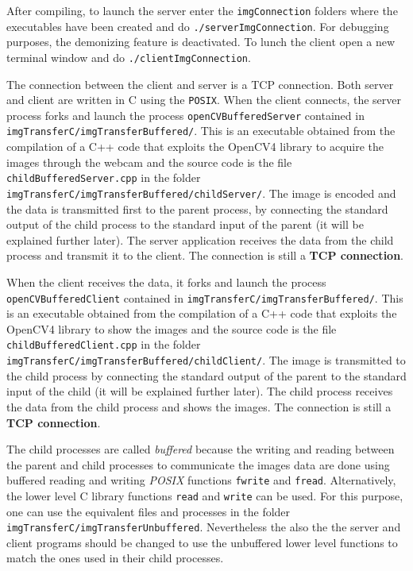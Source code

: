 \documentclass[12pt, letterpaper]{article}
\theoremstyle{definition}
\let\ti\textit
\let\tb\textbf
\begin{document}
After compiling, to launch the server enter the \lstinline+imgConnection+ folders where the executables have been created and do \lstinline+./serverImgConnection+. For debugging purposes, the demonizing feature is deactivated. To lunch the client open a new terminal window and do \lstinline+./clientImgConnection+.

The connection between the client and server is a TCP connection. Both server and client are written in C using the \lstinline+POSIX+. When the client connects, the server process forks and launch the process \lstinline+openCVBufferedServer+ contained in \lstinline+imgTransferC/imgTransferBuffered/+. This is an executable obtained from the compilation of a C++ code that exploits the OpenCV4 library to acquire the images through the webcam and the source code is the file \lstinline+childBufferedServer.cpp+ in the folder \lstinline+imgTransferC/imgTransferBuffered/childServer/+. The image is encoded and the data is transmitted first to the parent process, by connecting the standard output of the child process to the standard input of the parent (it will be explained further later). The server application receives the data from the child process and transmit it to the client. The connection is still a \tb{TCP connection}.

When the client receives the data, it forks and launch the process \lstinline+openCVBufferedClient+ contained in \lstinline+imgTransferC/imgTransferBuffered/+. This is an executable obtained from the compilation of a C++ code that exploits the OpenCV4 library to show the images and the source code is the file \lstinline+childBufferedClient.cpp+ in the folder \lstinline+imgTransferC/imgTransferBuffered/childClient/+. The image is transmitted to the child process by connecting the standard output of the parent to the standard input of the child (it will be explained further later). The child process receives the data from the child process and shows the images. The connection is still a \tb{TCP connection}.

The child processes are called \ti{buffered} because the writing and reading between the parent and child processes to communicate the images data are done using buffered reading and writing \ti{POSIX} functions \lstinline+fwrite+ and \lstinline+fread+. Alternatively, the lower level C library functions \lstinline+read+ and \lstinline+write+ can be used. For this purpose, one can use the equivalent files and processes in the folder \lstinline+imgTransferC/imgTransferUnbuffered+. Nevertheless the also the the server and client programs should be changed to use the unbuffered lower level functions to match the ones used in their child processes.
\end{document}
